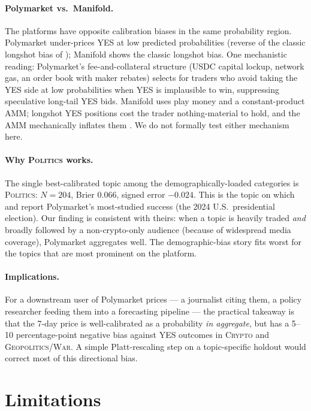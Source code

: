 \documentclass{article}
\begin{document}
\paragraph{Polymarket vs.\ Manifold.}
The platforms have opposite calibration biases in the same probability
region. Polymarket under-prices YES at low predicted probabilities
(reverse of the classic longshot bias of
\citet{snowberg2010explaining,page2013calibrated}); Manifold shows the
classic longshot bias. One mechanistic reading: Polymarket's
fee-and-collateral structure (USDC capital lockup, network gas, an
order book with maker rebates) selects for traders who avoid taking
the YES side at low probabilities when YES is implausible to win,
suppressing speculative long-tail YES bids. Manifold uses play money
and a constant-product AMM; longshot YES positions cost the trader
nothing-material to hold, and the AMM mechanically inflates them
\citep{hanson2003combinatorial}. We do not formally test either
mechanism here.

\paragraph{Why \textsc{Politics} works.}
The single best-calibrated topic among the demographically-loaded
categories is \textsc{Politics}: $N=204$, Brier $0.066$, signed error
$-0.024$. This is the topic on which \citet{tsang2026anatomy} and
\citet{cutting2025betting} report Polymarket's most-studied success
(the 2024 U.S.\ presidential election). Our finding is consistent
with theirs: when a topic is heavily traded \emph{and} broadly
followed by a non-crypto-only audience (because of widespread media
coverage), Polymarket aggregates well. The demographic-bias story
fits worst for the topics that are most prominent on the platform.

\paragraph{Implications.}
For a downstream user of Polymarket prices --- a journalist citing
them, a policy researcher feeding them into a forecasting pipeline ---
the practical takeaway is that the 7-day price is well-calibrated as a
probability \emph{in aggregate}, but has a 5--10 percentage-point
negative bias against YES outcomes in \textsc{Crypto} and
\textsc{Geopolitics/War}. A simple Platt-rescaling step on a
topic-specific holdout would correct most of this directional bias.

\section{Limitations}
\label{sec:limitations}
\end{document}
